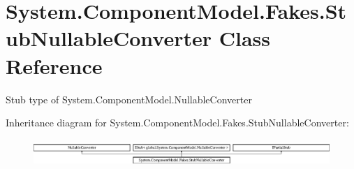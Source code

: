 \hypertarget{class_system_1_1_component_model_1_1_fakes_1_1_stub_nullable_converter}{\section{System.\-Component\-Model.\-Fakes.\-Stub\-Nullable\-Converter Class Reference}
\label{class_system_1_1_component_model_1_1_fakes_1_1_stub_nullable_converter}
}


Stub type of System.\-Component\-Model.\-Nullable\-Converter 


Inheritance diagram for System.\-Component\-Model.\-Fakes.\-Stub\-Nullable\-Converter\-:\begin{figure}[H]
\begin{center}
\leavevmode
\includegraphics[height=1.039926cm]{class_system_1_1_component_model_1_1_fakes_1_1_stub_nullable_converter}
\end{center}
\end{figure}

